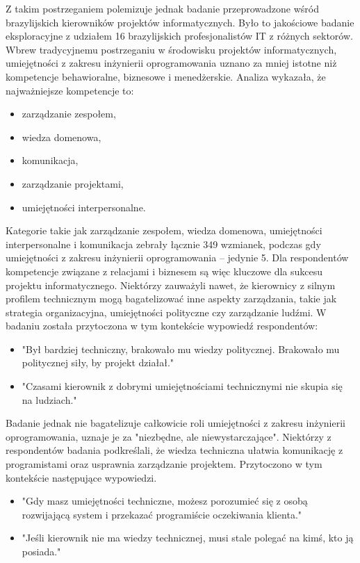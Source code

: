 Z takim postrzeganiem polemizuje jednak badanie przeprowadzone wśród brazylijskich kierowników projektów informatycznych.\autocite{silva2015project} Było to jakościowe badanie eksploracyjne z udziałem 16 brazylijskich profesjonalistów IT z różnych sektorów.
Wbrew tradycyjnemu postrzeganiu w środowisku projektów informatycznych, umiejętności z zakresu inżynierii oprogramowania uznano za mniej istotne niż kompetencje behawioralne, biznesowe i menedżerskie. Analiza wykazała, że najważniejsze kompetencje to:
\begin{itemize}
    \item zarządzanie zespołem,
    \item wiedza domenowa,
    \item komunikacja,
    \item zarządzanie projektami,
    \item umiejętności interpersonalne.
\end{itemize}
\autocite{silva2015project}

Kategorie takie jak zarządzanie zespołem, wiedza domenowa, umiejętności interpersonalne i komunikacja zebrały łącznie 349 wzmianek, podczas gdy umiejętności z zakresu inżynierii oprogramowania – jedynie 5. Dla respondentów kompetencje związane z relacjami i biznesem są więc kluczowe dla sukcesu projektu informatycznego. Niektórzy zauważyli nawet, że kierownicy z silnym profilem technicznym mogą bagatelizować inne aspekty zarządzania, takie jak strategia organizacyjna, umiejętności polityczne czy zarządzanie ludźmi. W badaniu została przytoczona w tym kontekście wypowiedź respondentów:
\begin{itemize}
    \item"Był bardziej techniczny, brakowało mu wiedzy politycznej. Brakowało mu politycznej siły, by projekt działał."
    \item"Czasami kierownik z dobrymi umiejętnościami technicznymi nie skupia się na ludziach." 
\end{itemize}

Badanie jednak nie bagatelizuje całkowicie roli umiejętności z zakresu inżynierii oprogramowania, uznaje je za "niezbędne, ale niewystarczające". Niektórzy z respondentów badania podkreślali, że wiedza techniczna ułatwia komunikację z programistami oraz usprawnia zarządzanie projektem. Przytoczono w tym kontekście następujące wypowiedzi.
\begin{itemize}
    \item"Gdy masz umiejętności techniczne, możesz porozumieć się z osobą rozwijającą system i przekazać programiście oczekiwania klienta."
    \item"Jeśli kierownik nie ma wiedzy technicznej, musi stale polegać na kimś, kto ją posiada."    
\end{itemize}


